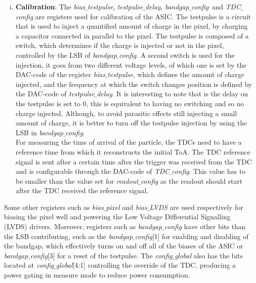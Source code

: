 \begin{enumerate}[i)]
			\item \textbf{Calibration}: The \textit{bias$\_$testpulse}, \textit{testpulse$\_$delay}, \textit{bandgap$\_$config} and \textit{TDC$\_$config} are registers used for calibration of the ASIC. The testpulse is a circuit that is used to inject a quantified amount of charge in the pixel, by charging a capacitor connected in parallel to the pixel. The testpulse is composed of a switch, which determines if the charge is injected or not in the pixel, controlled by the LSB of \textit{bandgap$\_$config}. A second switch is used for the injection, it goes from two different voltage levels, of which one is set by the DAC-code of the register \textit{bias$\_$testpulse}, which defines the amount of charge injected, and the frequency at which the switch changes position is defined by the DAC-code of \textit{testpulse$\_$delay}. It is interesting to note that is the delay on the testpulse is set to 0, this is equivalent to having no switching and so no charge injected. Although, to avoid parasitic effects still injecting a small amount of charge, it is better to turn off the testpulse injection by using the LSB in \textit{bandgap$\_$config}. \\ For measuring the time of arrival of the particle, the TDCs need to have a reference time from which it reconstructs the initial ToA. The TDC reference signal is sent after a certain time after the trigger was received from the TDC and is configurable through the DAC-code of \textit{TDC$\_$config}. This value has to be smaller than the value set for \textit{readout$\_$config} as the readout should start after the TDC received the reference signal.
		\end{enumerate}
		
		Some other registers such as \textit{bias$\_$pixel} and \textit{bias$\_$LVDS} are used respectively for biasing the pixel well and powering the Low Voltage Differential Signalling (LVDS) drivers. Moreover, registers such as \textit{bandgap$\_$config} have other bits than the LSB contributing, such as the \textit{bandgap$\_$config}[1] for enabling and disabling of the bandgap, which effectively turns on and off all of the biases of the ASIC or \textit{bandgap$\_$config}[3] for a reset of the testpulse. The \textit{config$\_$global} also has the bits located at \textit{config$\_$global}[4:1] controlling the override of the TDC, producing a power gating in measure mode to reduce power consumption. \\
		
	\clearpage
